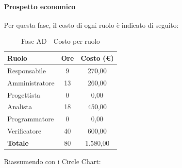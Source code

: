 \documentclass[../PianoProgetto.tex]{subfiles}
\begin{document}
\vfill
	
	\paragraph{Prospetto economico}
					Per questa fase, il costo di ogni ruolo è indicato di seguito:
					\begin{table}[h]
		\centering
	
		\begin{tabular}{l * {2}{c}}
			\toprule
			\textbf{Ruolo} & \textbf{Ore} & \textbf{Costo (\euro{})} \\
			\midrule
			Responsabile &	9 & 270,00 \\
			Amministratore & 13 & 260,00 \\
			Progettista & 0 & 0,00 \\
			Analista & 18 & 450,00 \\
			Programmatore & 0 & 0,00 \\
			Verificatore & 40 & 600,00 \\
			\midrule		
			\textbf{Totale} & 80 & 1.580,00 \\
			\bottomrule
		\end{tabular}
		\caption{Fase AD - Costo per ruolo}
		\label{tab:faseAD_costo}
	\end{table}
\vfill
\newpage
	
	Riassumendo con i Circle Chart:
\end{document}
